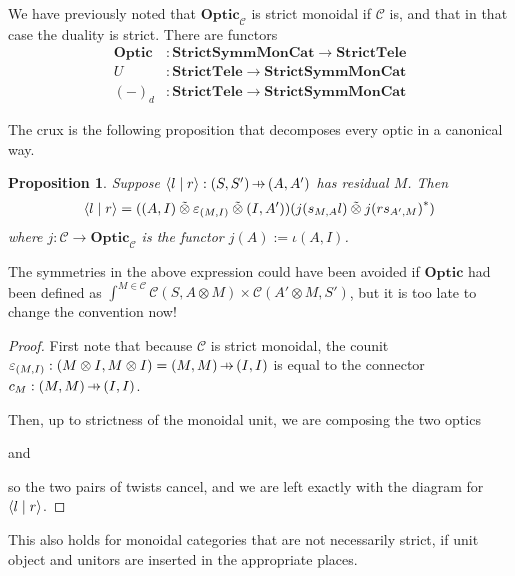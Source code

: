 \documentclass[11pt,letterpaper]{article}
\theoremstyle{plain}
\newtheorem{proposition}[theorem]{Proposition}
\theoremstyle{definition}
\newcommand{\C}{\mathscr{C}}
\newcommand{\StrictSymmMonCat}{\mathbf{StrictSymmMonCat}}
\newcommand{\StrictTele}{\mathbf{StrictTele}}
\newcommand{\Optic}{\mathbf{Optic}}
\newcommand{\switched}{\mathbin{\tilde{\otimes}}}
\newcommand{\rep}[2]{{\ensuremath \left\langle #1 \mid #2 \right\rangle}}
\newcommand{\hto}{\ensuremath{\,\mathaccent\shortmid\rightarrow\,}}
\begin{document}
We have previously noted that $\Optic_\C$ is strict monoidal if $\C$ is, and that in that case the duality is strict. There are functors
\begin{align*}
\Optic &: \StrictSymmMonCat \to \StrictTele \\
U &: \StrictTele \to \StrictSymmMonCat \\
{(-)}_d &: \StrictTele \to \StrictSymmMonCat 
\end{align*}

The crux is the following proposition that decomposes every optic in a canonical way.

\begin{proposition}\label{prop:optic-decompose}
  Suppose $\rep{l}{r} : (S, S') \hto (A, A')$ has residual $M$. Then
  \begin{align*}
    \rep{l}{r} = ((A, I) \switched \varepsilon_{(M, I)} \switched (I, A'))(j(s_{M,A}l) \switched j{(rs_{A',M})}^*)
  \end{align*}
  where $j : \C \to \Optic_\C$ is the functor $j(A) := \iota(A, I)$.
\end{proposition}
The symmetries in the above expression could have been avoided if $\Optic$ had been defined as $\int^{M \in \C} \C(S, A \otimes M) \times \C(A' \otimes M, S')$, but it is too late to change the convention now!
\begin{proof}
  First note that because $\C$ is strict monoidal, the counit $\varepsilon_{(M, I)} : (M \otimes I, M \otimes I) = (M, M) \hto (I, I)$ is equal to the connector $c_M : (M, M) \hto (I, I)$.

  Then, up to strictness of the monoidal unit, we are composing the two optics
  \begin{center}
    
  \end{center}
  and
  \begin{center}
    
  \end{center}
  so the two pairs of twists cancel, and we are left exactly with the diagram for $\rep{l}{r}$.
\end{proof}

This also holds for monoidal categories that are not necessarily strict, if unit object and unitors are inserted in the appropriate places.
\end{document}
